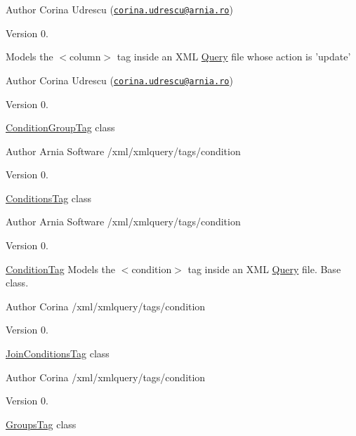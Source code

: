 \begin{DoxyAuthor}{Author}
Corina Udrescu (\href{mailto:corina.udrescu@arnia.ro}{\tt corina.\-udrescu@arnia.\-ro})  
\end{DoxyAuthor}
\begin{DoxyVersion}{Version}
0.
\end{DoxyVersion}
Models the $<$column$>$ tag inside an X\-M\-L \hyperlink{classQuery}{Query} file whose action is 'update'

\begin{DoxyAuthor}{Author}
Corina Udrescu (\href{mailto:corina.udrescu@arnia.ro}{\tt corina.\-udrescu@arnia.\-ro})  
\end{DoxyAuthor}
\begin{DoxyVersion}{Version}
0.
\end{DoxyVersion}
\hyperlink{classConditionGroupTag}{Condition\-Group\-Tag} class

\begin{DoxyAuthor}{Author}
Arnia Software /xml/xmlquery/tags/condition 
\end{DoxyAuthor}
\begin{DoxyVersion}{Version}
0.
\end{DoxyVersion}
\hyperlink{classConditionsTag}{Conditions\-Tag} class

\begin{DoxyAuthor}{Author}
Arnia Software /xml/xmlquery/tags/condition 
\end{DoxyAuthor}
\begin{DoxyVersion}{Version}
0.
\end{DoxyVersion}
\hyperlink{classConditionTag}{Condition\-Tag} Models the $<$condition$>$ tag inside an X\-M\-L \hyperlink{classQuery}{Query} file. Base class.

\begin{DoxyAuthor}{Author}
Corina /xml/xmlquery/tags/condition 
\end{DoxyAuthor}
\begin{DoxyVersion}{Version}
0.
\end{DoxyVersion}
\hyperlink{classJoinConditionsTag}{Join\-Conditions\-Tag} class

\begin{DoxyAuthor}{Author}
Corina /xml/xmlquery/tags/condition 
\end{DoxyAuthor}
\begin{DoxyVersion}{Version}
0.
\end{DoxyVersion}
\hyperlink{classGroupsTag}{Groups\-Tag} class

